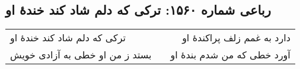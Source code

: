 \begin{center}
\section*{رباعی شماره ۱۵۶۰: ترکی که دلم شاد کند خندهٔ او}
\label{sec:1560}
\begin{longtable}{l p{0.5cm} r}
ترکی که دلم شاد کند خندهٔ او
&&
دارد به غمم زلف پراکندهٔ او
\\
بستد ز من او خطی به آزادی خویش
&&
آورد خطی که من شدم بندهٔ او
\\
\end{longtable}
\end{center}
